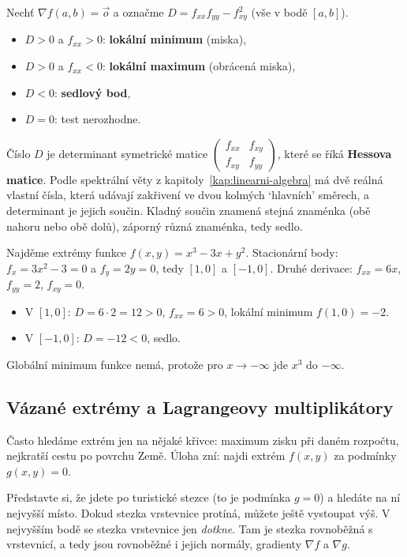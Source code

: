 \begin{definitionbox}
  Nechť $\nabla f(a, b) = \vec{o}$ a označme $D = f_{xx}f_{yy} - f_{xy}^2$ (vše v bodě $[a, b]$).
  \begin{itemize}
    \item $D > 0$ a $f_{xx} > 0$: \textbf{lokální minimum} (miska),
    \item $D > 0$ a $f_{xx} < 0$: \textbf{lokální maximum} (obrácená miska),
    \item $D < 0$: \textbf{sedlový bod},
    \item $D = 0$: test nerozhodne.
  \end{itemize}
\end{definitionbox}

Číslo $D$ je determinant symetrické matice $\begin{pmatrix} f_{xx} & f_{xy}\\ f_{xy} & f_{yy}\end{pmatrix}$, které se říká \textbf{Hessova matice}. Podle spektrální věty z kapitoly~\ref{kap:linearni-algebra} má dvě reálná vlastní čísla, která udávají zakřivení ve dvou kolmých `hlavních' směrech, a determinant je jejich součin. Kladný součin znamená stejná znaménka (obě nahoru nebo obě dolů), záporný různá znaménka, tedy sedlo.

\begin{example}
  Najděme extrémy funkce $f(x, y) = x^3 - 3x + y^2$. Stacionární body: $f_x = 3x^2 - 3 = 0$ a $f_y = 2y = 0$, tedy $[1, 0]$ a $[-1, 0]$. Druhé derivace: $f_{xx} = 6x$, $f_{yy} = 2$, $f_{xy} = 0$.
  \begin{itemize}
    \item V $[1, 0]$: $D = 6\cdot 2 = 12 > 0$, $f_{xx} = 6 > 0$, lokální minimum $f(1, 0) = -2$.
    \item V $[-1, 0]$: $D = -12 < 0$, sedlo.
  \end{itemize}
  Globální minimum funkce nemá, protože pro $x\to-\infty$ jde $x^3$ do $-\infty$.
\end{example}

\subsection{Vázané extrémy a Lagrangeovy multiplikátory}

Často hledáme extrém jen na nějaké křivce: maximum zisku při daném rozpočtu, nejkratší cestu po povrchu Země. Úloha zní: najdi extrém $f(x, y)$ za podmínky $g(x, y) = 0$.

Představte si, že jdete po turistické stezce (to je podmínka $g = 0$) a hledáte na ní nejvyšší místo. Dokud stezka vrstevnice protíná, můžete ještě vystoupat výš. V nejvyšším bodě se stezka vrstevnice jen \textit{dotkne}. Tam je stezka rovnoběžná s vrstevnicí, a tedy jsou rovnoběžné i jejich normály, gradienty $\nabla f$ a $\nabla g$.

